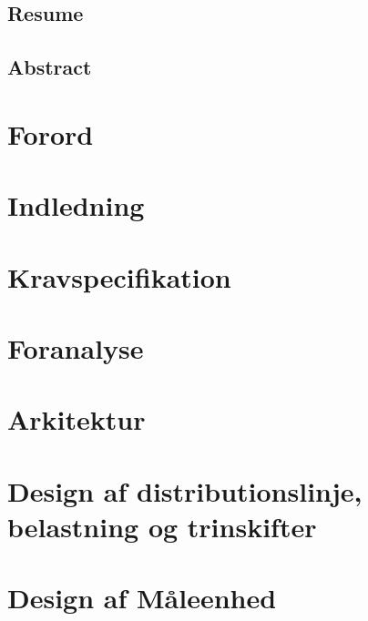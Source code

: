 \documentclass[a4paper, 11pt,oneside,openany, danish]{memoir} %
\begin{document}



\frontmatter

\section{Resume}

\section{Abstract}





\tableofcontents

\chapter{Forord}                       


\chapter{Indledning}

\chapter{Kravspecifikation}



\chapter{Foranalyse}

\chapter{Arkitektur}




\chapter{Design af distributionslinje, belastning og trinskifter}
\chapter{Design af Måleenhed}
\end{document}
